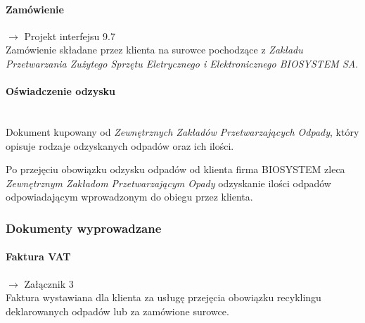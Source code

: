 	\paragraph{Zamówienie} $\rightarrow$ Projekt interfejsu 9.7 \\
	Zamówienie składane przez klienta na surowce pochodzące z \emph{Zakładu Przetwarzania Zużytego Sprzętu Eletrycznego i Elektronicznego BIOSYSTEM SA}.

	\paragraph{Oświadczenie odzysku} \ \\
	Dokument kupowany od \emph{Zewnętrznych Zakładów Przetwarzających Odpady}, który opisuje rodzaje odzyskanych odpadów oraz ich ilości.

	Po przejęciu obowiązku odzysku odpadów od klienta firma BIOSYSTEM zleca \emph{Zewnętrznym Zakładom Przetwarzającym Opady} odzyskanie ilości odpadów odpowiadającym wprowadzonym do obiegu przez klienta.

\subsubsection{Dokumenty wyprowadzane}
	\paragraph{Faktura VAT} $\rightarrow$ Załącznik 3 \\
	Faktura wystawiana dla klienta za usługę przejęcia obowiązku recyklingu deklarowanych odpadów lub za zamówione surowce.